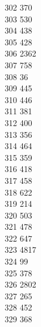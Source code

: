 { 302	370 \\
 303	530 \\
 304	438 \\
 305	428 \\
 306	2362 \\
 307	758 \\
 308	36 \\
 309	445 \\
 310	446 \\
 311	381 \\
 312	400 \\
 313	356 \\
 314	464 \\
 315	359 \\
 316	418 \\
 317	458 \\
 318	622 \\
 319	214 \\
 320	503 \\
 321	478 \\
 322	647 \\
 323	4817 \\
 324	99 \\
 325	378 \\
 326	2802 \\
 327	265 \\
 328	452 \\
 329	368 \\
}

